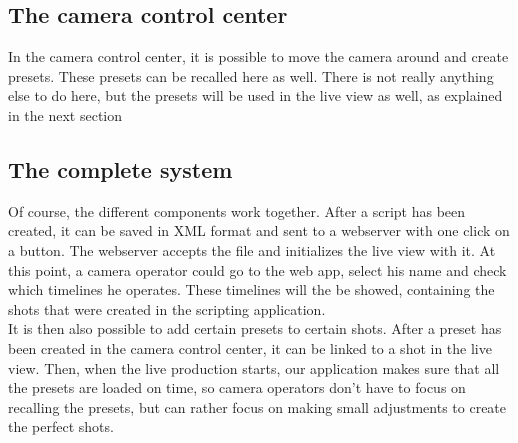 \subsection*{The camera control center}
In the camera control center, it is possible to move the camera around and create presets. These presets can be recalled here as well. There is not really anything else to do here, but the presets will be used in the live view as well, as explained in the next section

\subsection*{The complete system}
Of course, the different components work together. After a script has been created, it can be saved in XML format and sent to a webserver with one click on a button. The webserver accepts the file and initializes the live view with it. At this point, a camera operator could go to the web app, select his name and check which timelines he operates. These timelines will the be showed, containing the shots that were created in the scripting application.\\
It is then also possible to add certain presets to certain shots. After a preset has been created in the camera control center, it can be linked to a shot in the live view. Then, when the live production starts, our application makes sure that all the presets are loaded on time, so camera operators don't have to focus on recalling the presets, but can rather focus on making small adjustments to create the perfect shots.